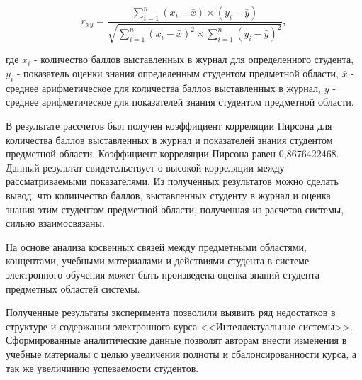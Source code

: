 $$
    r_{xy} =  \frac{\sum_{i=1}^{n} (x_i - \bar x) \times (y_i - \bar y)}{ \sqrt{\sum_{i=1}^{n}(x_i - \bar x)^2 \times \sum_{i=1}^{n}(y_i - \bar y)^2}},
$$

где \(x_i\) - количество баллов выставленных в журнал для определенного студента, \(y_i\) - показатель оценки знания определенным студентом предметной области, \(\bar x\) - среднее арифметическое для количества баллов выставленных в журнал, \(\bar y\) - среднее арифметическое для показателей знания студентом предметной области. 

В результате рассчетов был получен коэффициент корреляции Пирсона для количества баллов выставленных в журнал и показателей знания студентом предметной области. Коэффициент корреляции Пирсона равен 0,8676422468. Данный результат свидетельствует о высокой корреляции между рассматриваемыми показателями. Из полученных результатов можно сделать вывод, что колиичество баллов, выставленных студенту в журнал и оценка знания этим студентом предметной области, полученная из расчетов системы, сильно взаимосвязаны. 

На основе анализа косвенных связей между предметными областями, концептами, учебными материалами и действиями студента в системе электронного обучения может быть произведена оценка знаний студента предметных областей системы.  

Полученные результаты эксперимента позволили выявить ряд недостатков в структуре и содержании электронного курса <<Интеллектуальные системы>>. Сформированные аналитические данные позволят авторам внести изменения в учебные материалы с целью увеличения полноты и сбалонсированности курса, а так же увеличинию успеваемости студентов.

\clearpage